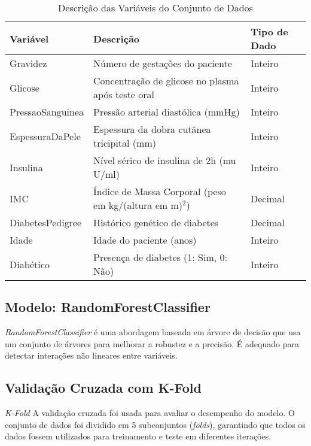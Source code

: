 \documentclass[a4paper,12pt]{article}
\begin{document}
\begin{table}[H]
    \centering
    \caption{Descrição das Variáveis do Conjunto de Dados}
    \begin{tabular}{|p{3cm}|p{8cm}|p{3cm}|}
        \hline
        \textbf{Variável} & \textbf{Descrição} & \textbf{Tipo de Dado} \\
        \hline
        Gravidez & Número de gestações do paciente & Inteiro \\
        \hline
        Glicose & Concentração de glicose no plasma após teste oral & Inteiro \\
        \hline
        PressaoSanguinea & Pressão arterial diastólica (mmHg) & Inteiro \\
        \hline
        EspessuraDaPele & Espessura da dobra cutânea tricipital (mm) & Inteiro \\
        \hline
        Insulina & Nível sérico de insulina de 2h (mu U/ml) & Inteiro \\
        \hline
        IMC & Índice de Massa Corporal (peso em kg/(altura em m)$^2$) & Decimal \\
        \hline
        DiabetesPedigree & Histórico genético de diabetes & Decimal \\
        \hline
        Idade & Idade do paciente (anos) & Inteiro \\
        \hline
        Diabético & Presença de diabetes (1: Sim, 0: Não) & Inteiro \\
        \hline
    \end{tabular}
\end{table}

\subsection{Modelo: RandomForestClassifier}
\textit{RandomForestClassifier} é uma abordagem baseada em árvore de decisão que usa um conjunto de árvores para melhorar a robustez e a precisão. É adequado para detectar interações não lineares entre variáveis.

\subsection{Validação Cruzada com K-Fold}
\textit{K-Fold} A validação cruzada foi usada para avaliar o desempenho do modelo. O conjunto de dados foi dividido em 5 subconjuntos (\textit{folds}), garantindo que todos os dados fossem utilizados para treinamento e teste em diferentes iterações.
\end{document}
